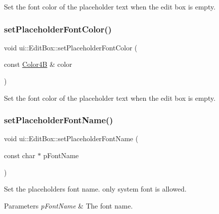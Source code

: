 Set the font color of the placeholder text when the edit box is empty. \mbox{\label{classui_1_1EditBox_a29ddb4a951ce3cd8c2946ed13cf4c2ee}} 
\subsubsection{\texorpdfstring{set\+Placeholder\+Font\+Color()}{setPlaceholderFontColor()}\hspace{0.1cm}{\footnotesize\ttfamily [4/4]}}
{\footnotesize\ttfamily void ui\+::\+Edit\+Box\+::set\+Placeholder\+Font\+Color (\begin{DoxyParamCaption}\item[{const \hyperlink{structColor4B}{Color4B} \&}]{color }\end{DoxyParamCaption})}

Set the font color of the placeholder text when the edit box is empty. \mbox{\label{classui_1_1EditBox_a7d5130331ff087d3b0544cac2939a55b}} 
\subsubsection{\texorpdfstring{set\+Placeholder\+Font\+Name()}{setPlaceholderFontName()}\hspace{0.1cm}{\footnotesize\ttfamily [1/2]}}
{\footnotesize\ttfamily void ui\+::\+Edit\+Box\+::set\+Placeholder\+Font\+Name (\begin{DoxyParamCaption}\item[{const char $\ast$}]{p\+Font\+Name }\end{DoxyParamCaption})}

Set the placeholder\textquotesingle{}s font name. only system font is allowed. 
\begin{DoxyParams}{Parameters}
{\em p\+Font\+Name} & The font name. \\
\hline
\end{DoxyParams}
\mbox{\label{classui_1_1EditBox_a7d5130331ff087d3b0544cac2939a55b}} 
